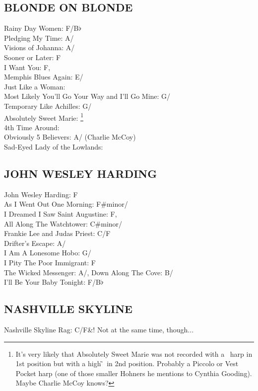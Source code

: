 \documentclass[a4paper,twoside]{memoir}
\begin{document}
\subsection{BLONDE ON BLONDE}
Rainy Day Women: F/B$\flat$\\ Pledging My Time: A/\D\\ Visions of Johanna: A/\D\\ Sooner or Later: F\\ I Want You: F,\\
Memphis Blues Again: E/\A\\ Just Like a Woman: \E\\ Most Likely You'll Go Your Way and I'll Go Mine: G/\C\\ Temporary Like Achilles: G/\C\\ Absolutely Sweet Marie: \D\footnote{It's very likely that Absolutely Sweet
Marie was not recorded with a \D~harp in 1st position but with a high
\G~in 2nd position. Probably a Piccolo or Vest Pocket harp (one of
those smaller Hohners he mentions to Cynthia Gooding). Maybe
Charlie McCoy knows?}\\ 4th Time Around: \E\\ Obviously 5 Believers: A/\D
(Charlie McCoy)\\ Sad-Eyed Lady of the Lowlands: \D\\


\subsection{JOHN WESLEY HARDING}
John Wesley Harding: F\\ As I Went Out One Morning: F\#minor/\A\\ I Dreamed I Saw Saint Augustine: F,\\
All Along The Watchtower: C\#minor/\E\\ Frankie Lee and Judas Priest: C/F\\ Drifter's Escape: A/\D\\ I Am A Lonesome Hobo: G/\C\\ I Pity The  Poor Immigrant: F\\ The Wicked Messenger: A/\D,
Down Along The Cove: B/\E\\ I'll Be Your Baby Tonight: F/B$\flat$


\subsection{NASHVILLE SKYLINE}
Nashville Skyline Rag: C/F\&\C! Not at the same time, though...
\end{document}
